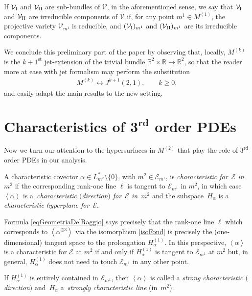 \documentclass[10pt,a4paper]{amsart}
\newcommand{\M}{\mathcal{V}}
\newcommand{\MM}{\mathcal{V}_{\textrm{\normalfont I}}}
\newcommand{\MMM}{\mathcal{V}_{\textrm{\normalfont II}}}
\newcommand{\E}{\mathcal{E}}
\newcommand{\Span}[1]{\left\langle #1 \right\rangle}
\newcommand{\St}{^\textrm{st}}
\newcommand{\Rd}{^\textrm{rd}}
\numberwithin{equation}{section}
\begin{document}
If $\MM$ and $\MMM$ are sub-bundles of $\M$, in the aforementioned sense, we say that $\MM$ and $\MMM$ are irreducible components of $\M$ if, for any point $m^1\in M^{(1)}$, the projective variety $\M_{m^1}$ is reducible, and $(\MM)_{m^1}$ and $(\MMM)_{m^1}$ are its irreducible components.

We conclude this preliminary part of the paper by observing that, locally, $M^{(k)}$ is the $k+1\St$ jet-extension of the trivial bundle $\mathbb{R}^2\times\mathbb{R}\to\mathbb{R}^2$, so that the reader more at ease with jet formalism may perform the substitution
 \begin{gather}\label{sostituzionePerIGettofili}
 M^{(k)}\longleftrightarrow J^{k+1}(2,1) ,\qquad k\geq 0 ,
\end{gather}
and easily adapt the main results to the new setting.

\section[Characteristics of $3\Rd$ order PDEs]{Characteristics of $\boldsymbol{3\Rd}$ order PDEs}\label{SecChar3ordPDEs}

Now we turn our attention to the hypersurfaces in $M^{(2)}$ that play the role of $3\Rd$ order PDEs in our analysis.

\begin{Definition} A characteristic covector $\alpha\in L_{m^2}^\ast{\setminus}\{0\}$, with $m^2\in\E_{m^1}$, is \emph{characteristic for~$\E$ in~$m^2$} if the corresponding rank-one line $\ell$ is tangent to $\E_{m^1}$ in $m^2$, in which case $\Span{\alpha}$ is a~\emph{characteristic $($direction$)$ for~$\E$ in~$m^2$} and the subspace~$H_\alpha$ is a \emph{characteristic hyperplane for~$\E$}.
\end{Definition}

Formula
 \eqref{eqGeometriaDelRaggio} says precisely that the rank-one line $\ell$ which corresponds to $\Span{\alpha^{\otimes 3}}$ via the isomorphism \eqref{isoFond} is precisely the (one-dimensional) tangent space to the prolongation $H_\alpha^{(1)}$. In this perspective, $\Span{\alpha}$ is a characteristic for $\E$ at $m^2$ if and only if $ H_\alpha^{(1)}$ is tangent to $\E_{m^1}$ at $m^2$ but, in general, $ H_\alpha^{(1)}$ does not need to touch $\E_{m^1}$ in any other point.
\begin{Definition}\label{defStrongChar}
 If $ H_\alpha^{(1)}$ is {entirely contained} in $\E_{m^1}$, then $\Span{\alpha}$ is called a \emph{strong characteristic $($direction$)$} and~$H_\alpha$ a~\emph{strongly characteristic line} (in~$m^2$).
\end{Definition}
\end{document}
